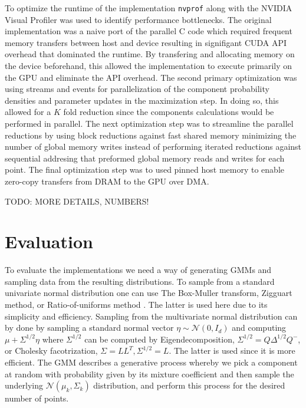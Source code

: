 \documentclass{article}
\begin{document}
To optimize the runtime of the implementation \texttt{nvprof} along with the NVIDIA Visual Profiler was used to identify performance bottlenecks. The original implementation was a naive port of the parallel C code which required frequent memory transfers between host and device resulting in signifigant CUDA API overhead that dominated the runtime. By transfering and allocating memory on the device beforehand, this allowed the implementation to execute primarily on the GPU and eliminate the API overhead. The second primary optimization was using streams and events for parallelization of the component probability densities and parameter updates in the maximization step. In doing so, this allowed for a $K$ fold reduction since the components calculations would be performed in parallel. The next optimization step was to streamline the parallel reductions by using block reductions against fast shared memory minimizing the number of global memory writes instead of performing iterated reductions against sequential addresing that preformed global memory reads and writes for each point. The final optimization step was to used pinned host memory to enable zero-copy transfers from DRAM to the GPU over DMA. 

TODO: MORE DETAILS, NUMBERS!

\section{Evaluation}

To evaluate the implementations we need a way of generating GMMs and sampling data from the resulting distributions. To sample from a standard univariate normal distribution one can use The Box-Muller transform, Zigguart method, or Ratio-of-uniforms method \cite{kinderman1977computer}. The latter is used here due to its simplicity and efficiency. Sampling from the multivariate normal distribution can by done by sampling a standard normal vector $\eta \sim \mathcal{N}(0 ,I_d)$ and computing $\mu + \Sigma^{1/2} \eta$ where $\Sigma^{1/2}$ can be computed by Eigendecomposition, $\Sigma^{1/2} = Q \Delta^{1/2} Q^{-}$, or Cholesky facotrization, $\Sigma = L L^T, \Sigma^{1/2} = L$. The latter is used since it is more efficient. The GMM describes a generative process whereby we pick a component at random with probability given by its mixture coefficient and then sample the underlying $\mathcal{N}(\mu_k, \Sigma_k)$ distribution, and perform this process for the desired number of points.
\end{document}

